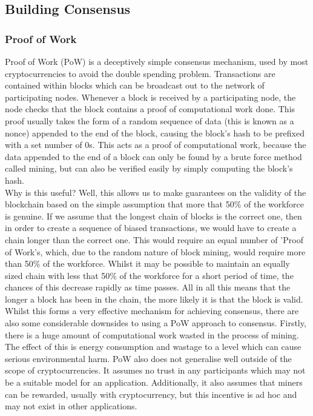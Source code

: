 \documentclass[12pt,a4paper,twoside,openright]{report}
\begin{document}
		\subsection{Building Consensus}
			\subsubsection*{Proof of Work}
			Proof of Work (PoW) is a deceptively simple consensus mechanism, used by most cryptocurrencies to avoid the double spending problem.
			Transactions are contained within blocks which can be broadcast out to the network of participating nodes. 
			Whenever a block is received by a participating node, the node checks that the block contains a proof of computational work done. 
			This proof usually takes the form of a random sequence of data (this is known as a nonce) appended to the end of the block, causing the block's hash to be prefixed with a set number of 0s.
			This acts as a proof of computational work, because the data appended to the end of a block can only be found by a brute force method called mining, but can also be verified easily by simply computing the block's hash.\\
			
			Why is this useful? 
			Well, this allows us to make guarantees on the validity of the blockchain based on the simple assumption that more that 50\% of the workforce is genuine.
			If we assume that the longest chain of blocks is the correct one, then in order to create a sequence of biased transactions, we would have to create a chain longer than the correct one. 
			This would require an equal number of 'Proof of Work's, which, due to the random nature of block mining, would require more than 50\% of the workforce.
			Whilst it may be possible to maintain an equally sized chain with less that 50\% of the workforce for a short period of time, the chances of this decrease rapidly as time passes.
			All in all this means that the longer a block has been in the chain, the more likely it is that the block is valid.\\

			Whilst this forms a very effective mechanism for achieving consensus, there are also some considerable downsides to using a PoW approach to consensus. 
			Firstly, there is a huge amount of computational work wasted in the process of mining. 
			The effect of this is energy consumption \cite{BitcoinEnergy} and wastage to a level which can cause serious environmental harm.
			PoW also does not generalise well outside of the scope of cryptocurrencies.
			It assumes no trust in any participants which may not be a suitable model for an application. 
			Additionally, it also assumes that miners can be rewarded, usually with cryptocurrency, but this incentive is ad hoc and may not exist in other applications.
			
\end{document}
